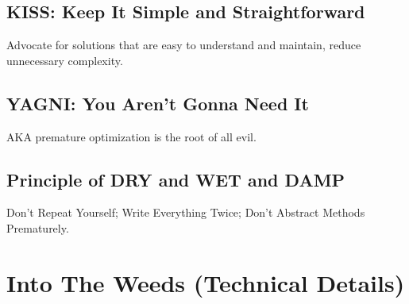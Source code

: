 \subsection{KISS: Keep It Simple and Straightforward}
\begin{notes}
    Advocate for solutions that are easy to understand and maintain, reduce unnecessary complexity.
\end{notes}

\subsection{YAGNI: You Aren't Gonna Need It}
\begin{notes}
    AKA premature optimization is the root of all evil. 
\end{notes}

\subsection{Principle of DRY and WET and DAMP}
\begin{notes}
    Don't Repeat Yourself; Write Everything Twice; Don't Abstract Methods Prematurely.
\end{notes}
\newpage

\section{Into The Weeds (Technical Details)}
